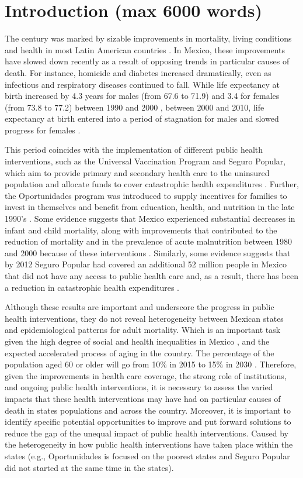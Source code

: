 \documentclass{article}
\begin{document}
\section*{Introduction (max 6000 words)}
The  century was marked by sizable improvements in mortality, living
conditions and health in most Latin American countries \citep{who2000}. 
In Mexico, these improvements have slowed down recently as a result of opposing
trends in particular causes of death. For instance, homicide and diabetes
increased dramatically, even as infectious and
respiratory diseases continued to fall. While life
expectancy at birth increased by 4.3 years for males (from 67.6 to 71.9) and 3.4
for females (from 73.8 to 77.2) between 1990 and 2000 \citep{SOMEDE},
between 2000 and 2010, life expectancy at birth entered into a period of
stagnation for males and slowed progress for females \citep{canudas2014}. 


This
period coincides with the implementation of different public health
interventions, such as the Universal Vaccination Program and Seguro
Popular, which aim to provide primary and secondary
health care to the uninsured population and allocate funds to cover catastrophic
health expenditures \citep{knaul2005}. Further, the Oportunidades program
was introduced to supply incentives for families to invest in themselves and
benefit from education, health, and nutrition in the late 1990's \citep{neufeld2012}. Some evidence
suggests that Mexico experienced substantial decreases in infant and child
mortality, along with improvements that contributed to the reduction of
mortality and in the prevalence of acute malnutrition between 1980 and 2000
because of these interventions \citep{sepulveda2006}. Similarly, some evidence
suggests that by 2012 Seguro Popular had covered an additional 52 million
people in Mexico that did not have any access to public health care and, as a result, there has been a reduction in catastrophic health expenditures \citep{knaul2012}.

 Although these results are important and underscore the progress in public health interventions,  they do not reveal heterogeneity between
 Mexican states and epidemiological patterns for adult mortality.  Which is an important task given the high degree of social and health inequalities in Mexico \citep{Frenk2006}, and the expected accelerated process of aging in the country.   The percentage of the population aged 60 or older will go from 10\% in 2015 to 15\% in 2030 \citep{CONAPO}. Therefore,  given the improvements
 in health care coverage, the strong role of institutions, and ongoing public
 health interventions, it is necessary to assess the varied impacts that
 these health interventions may have had on particular causes of death in states
 populations and across the country. Moreover, it is important to identify specific potential opportunities to improve and put forward solutions to reduce the gap of  the unequal impact of public health interventions. Caused by the heterogeneity in how public health interventions have taken place within the states (e.g., Oportunidades is focused on the poorest states and Seguro Popular did not started at the same time in the states).  
 
\end{document}
